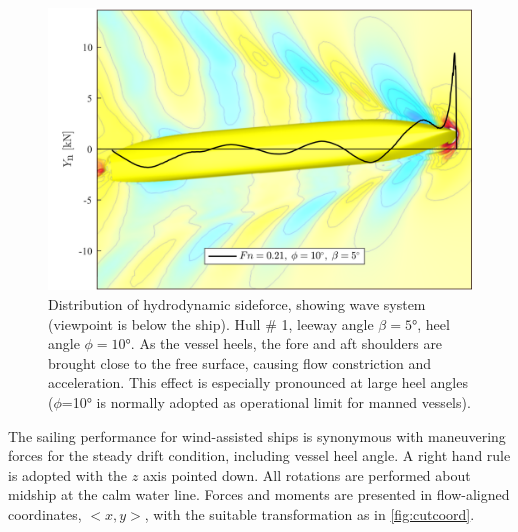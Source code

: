 \documentclass[twoside,twocolumn]{article}
\begin{document}
	\begin{figure}[!h]
		\centering
		\includegraphics[width=.7\textwidth]{images/hull1.png}  %
		\caption{Distribution of hydrodynamic sideforce, showing wave system (viewpoint is below the ship).  Hull \# 1, leeway angle $\beta=\ang{5}$, heel angle $\phi=\ang{10}$. As the vessel heels, the fore and aft shoulders are brought close to the free surface, causing flow constriction and acceleration. This effect is especially pronounced at large heel angles ($\phi$=\ang{10} is normally adopted as operational limit for manned vessels).}
		\label{fig:Ynphi}
	\end{figure}
	
	
	The sailing performance for wind-assisted ships is synonymous with maneuvering forces for the steady drift condition, including vessel heel angle. A right hand rule is adopted with the $z$ axis pointed down. All rotations are performed about midship at the calm water line. Forces and moments are presented in flow-aligned coordinates, $<x,y>$, with the suitable transformation as in \cref{fig:cutcoord}.
	
\end{document}
